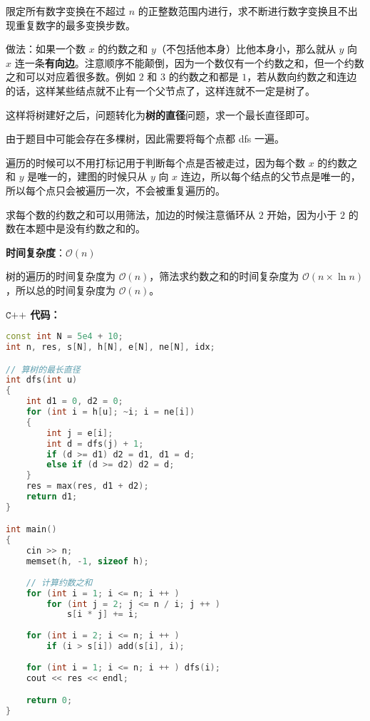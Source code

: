 限定所有数字变换在不超过 $n$ 的正整数范围内进行，求不断进行数字变换且不出现重复数字的最多变换步数。

做法：如果一个数 $x$ 的约数之和 $y$（不包括他本身）比他本身小，那么就从 $y$ 向 $x$ 连一条\textbf{有向边}。注意顺序不能颠倒，因为一个数仅有一个约数之和，但一个约数之和可以对应着很多数。例如 $2$ 和 $3$ 的约数之和都是 $1$，若从数向约数之和连边的话，这样某些结点就不止有一个父节点了，这样连就不一定是树了。

这样将树建好之后，问题转化为\textbf{树的直径}问题，求一个最长直径即可。

由于题目中可能会存在多棵树，因此需要将每个点都 dfs 一遍。

遍历的时候可以不用打标记用于判断每个点是否被走过，因为每个数 $x$ 的约数之和 $y$ 是唯一的，建图的时候只从 $y$ 向 $x$ 连边，所以每个结点的父节点是唯一的，所以每个点只会被遍历一次，不会被重复遍历的。

求每个数的约数之和可以用筛法，加边的时候注意循环从 $2$ 开始，因为小于 $2$ 的数在本题中是没有约数之和的。

\textbf{时间复杂度}：$\mathcal{O}(n)$

树的遍历的时间复杂度为 $\mathcal{O}(n)$，筛法求约数之和的时间复杂度为 $\mathcal{O}(n \times \ln n)$，所以总的时间复杂度为 $\mathcal{O}(n)$。

\textbf{$\texttt{C++}$ 代码：}
\begin{lstlisting}[language=cpp]
const int N = 5e4 + 10;
int n, res, s[N], h[N], e[N], ne[N], idx;

// 算树的最长直径
int dfs(int u)
{
    int d1 = 0, d2 = 0;
    for (int i = h[u]; ~i; i = ne[i])
    {
        int j = e[i];
        int d = dfs(j) + 1;
        if (d >= d1) d2 = d1, d1 = d;
        else if (d >= d2) d2 = d;
    }
    res = max(res, d1 + d2);
    return d1;
}

int main()
{
    cin >> n;
    memset(h, -1, sizeof h);
    
    // 计算约数之和
    for (int i = 1; i <= n; i ++ )
        for (int j = 2; j <= n / i; j ++ )
            s[i * j] += i;
            
    for (int i = 2; i <= n; i ++ )
        if (i > s[i]) add(s[i], i);
        
    for (int i = 1; i <= n; i ++ ) dfs(i);
    cout << res << endl;

    return 0;
}
\end{lstlisting}